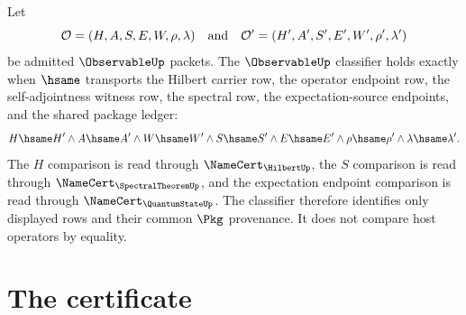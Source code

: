 \begin{definition}
\label{def:observable-spectral-expectation-classifier}
Let
$$
\mathcal{O}=(H,A,S,E,W,\rho,\lambda)
\quad\hbox{and}\quad
\mathcal{O}'=(H',A',S',E',W',\rho',\lambda')
$$
be admitted $\ObservableUp$ packets. The $\ObservableUp$ classifier holds
exactly when $\hsame$ transports the Hilbert carrier row, the operator
endpoint row, the self-adjointness witness row, the spectral row, the
expectation-source endpoints, and the shared package ledger:
$$
H\hsame H'\land A\hsame A'\land W\hsame W'\land S\hsame S'
\land E\hsame E'\land \rho\hsame\rho'\land \lambda\hsame\lambda'.
$$
The $H$ comparison is read through $\NameCert_{\HilbertUp}$, the $S$
comparison is read through $\NameCert_{\SpectralTheoremUp}$, and the
expectation endpoint comparison is read through $\NameCert_{\QuantumStateUp}$.
The classifier therefore identifies only displayed rows and their common
$\Pkg$ provenance. It does not compare host operators by equality.
\end{definition}

\section{The certificate}
\label{sec:observable-certificate}

